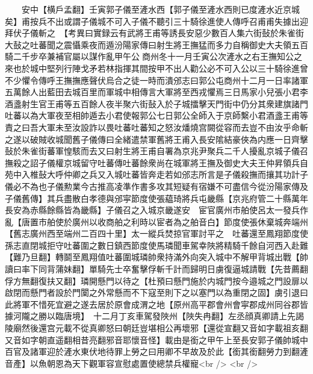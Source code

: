 　　安中【横戶孟翻】壬寅郭子儀至滻水西【郭子儀至滻水西則已度滻水近京城矣】甫按兵不出或謂子儀城不可入子儀不聽引三十騎徐進使人傳呼召甫甫失據出迎拜伏子儀斬之　【考異曰實録云有武將王甫等誘長安惡少數百人集六街鼔於朱雀街大鼔之吐蕃聞之震懾乘夜而遁汾陽家傳曰射生將王撫猛而多力自稱御史大夫領五百騎二千步卒兼補官屬以謀作亂甲午公商州冬十一月壬寅公次滻水之右王撫知公之來也於城中堅列行陣戈矛若林指揮其間按甲不出人勸公必不可入公以三十騎徐進曾不少懼令傳呼王撫撫應聲伏烏合之徒一時而潰邠志曰郭公屯商州十二月一日率諸軍五萬餘人出藍田去城百里而軍城中相傳言大軍將至西戎懼焉三日馬家小兒張小君李酒盞射生官王甫等五百餘人夜半聚六街鼔入於子城擂擊天門街中仍分其衆建旗諸門吐蕃以為大軍夜至相帥遁去小君使報郭公七日郭公全師入于京師繫小君酒盞王甫等責之曰吾大軍未至汝設詐以畏吐蕃吐蕃知之怒汝燔燒宫闕從容而去豈不由汝乎命斬之遂以破賊收城聞舊子儀傳曰全緒遣禁軍舊將王甫入長安隂結豪俠為内應一日齊擊鼔於朱雀街蕃軍惶駭而去又曰射生將王甫自署為京兆尹聚兵二千人擾亂京城子儀召撫殺之詔子儀權京城留守吐蕃傳吐蕃餘衆尚在城軍將王撫及御史大夫王仲昇領兵自苑中入椎鼔大呼仲卿之兵又入城吐蕃皆奔走若如邠志所言是子儀殺撫而攘其功計子儀必不為也子儀勲業今古推高凌準作書多攻其短疑有宿嫌不可盡信今從汾陽家傳及子儀舊傳】其兵盡散白孝德與邠寜節度使張藴琦將兵屯畿縣【京兆府管二十縣萬年長安為赤縣餘縣皆為畿縣】子儀召之入城京畿遂安　宦官廣州市舶使呂太一發兵作亂【唐置市舶使於廣州以收商舶之利時以宦者為之舶音白】節度使張休棄城奔端州【舊志廣州西至端州二百四十里】太一縱兵焚掠官軍討平之　吐蕃還至鳳翔節度使孫志直閉城拒守吐蕃圍之數日鎮西節度使馬璘聞車駕幸陜將精騎千餘自河西入赴難【難乃旦翻】轉鬬至鳳翔值吐蕃圍城璘帥衆持滿外向突入城中不解甲背城出戰【帥讀曰率下同背蒲妹翻】單騎先士卒奮擊俘斬千計而歸明日虜復逼城請戰【先昔薦翻俘方無翻復扶又翻】璘開懸門以待之【杜預曰懸門施於内城門按今邉城之門設扉以啟閉而懸門者設於門闑之外常懸而不下寇至則下之以塞門以為重閉之固】虜引退曰此將軍不惜死宜避之遂去居於原會成渭之地【原州高平郡會州會寜郡成州同谷郡皆據河隴之勝以臨唐境】　十二月丁亥車駕發陜州【陜失冉翻】左丞顔真卿請上先謁陵廟然後還宫元載不從真卿怒曰朝廷豈堪相公再壞邪【還從宣翻又音如字載祖亥翻又音如字朝直遥翻相昔亮翻邪音耶懷音怪】載由是銜之甲午上至長安郭子儀帥城中百官及諸軍迎於滻水東伏地待罪上勞之曰用卿不早故及於此【銜其銜翻勞力到翻滻音產】以魚朝恩為天下觀軍容宣慰處置使總禁兵權寵<br />
<br />
